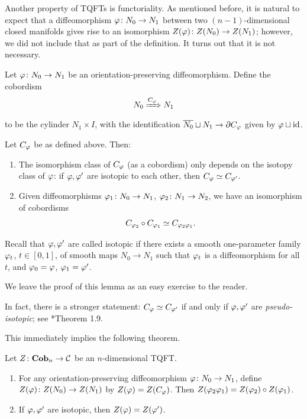 Another property of TQFTs is functoriality. As mentioned before, it is
natural to expect that a diffeomorphism $\varphi \colon N_0\to N_1$ between two
$(n-1)$-dimensional closed manifolds gives rise to an isomorphism
$Z(\varphi)\colon Z(N_0)\to Z(N_1)$; however, we did not include that as part of
the definition. It turns out that it is not necessary.

Let $\varphi \colon N_0\to N_1$ be an orientation-preserving diffeomorphism.
Define the cobordism
\begin{equation}\label{e:Cph}
  N_0\xRightarrow{C_\varphi} N_1
\end{equation}
to be the cylinder $N_1\times I$, with the identification $\overline{N_0}\sqcup N_1
\to \partial C_\varphi$ given by $\varphi\sqcup \operatorname{id}$.

\begin{lemma}\label{l:tqft-isotopy}
  Let $C_\varphi$ be as defined above. Then:
  \begin{enumerate}
    \item The isomorphism class of $C_\varphi$ \textup{(}as a cobordism\textup{)}
    only depends on the
    isotopy class of $\varphi$: if $\varphi, \varphi'$ are isotopic to each other, then
      $C_\varphi\simeq C_{\varphi'}$.
    \item Given diffeomorphisms $\varphi_1\colon N_0\to N_1$, $\varphi_2\colon N_1\to
      N_2$, we have an isomorphism of cobordisms
      $$
        C_{\varphi_2}\circ C_{\varphi_1}\simeq C_{\varphi_2 \varphi_1}.
      $$
  \end{enumerate}
\end{lemma}
Recall that $\varphi, \varphi'$ are called isotopic if there exists a smooth
one-parameter family $\varphi_t$, $t\in[0,1]$, of smooth maps $N_0\to N_1$ such that
$\varphi_t$ is a diffeomorphism for all $t$, and $\varphi_0=\varphi$, $\varphi_1=\varphi'$.

We leave the proof of this lemma as an easy exercise to the reader.

\begin{remark}\label{r:pseudo-isotopy}
  In fact, there is a stronger statement: $C_\varphi\simeq C_{\varphi'}$ if and only if
  $\varphi, \varphi'$ are \emph{pseudo-isotopic}; see
  *{Theorem 1.9}.
\end{remark}




This immediately implies  the following theorem.
\begin{theorem}\label{t:tqft-functoriality}
  Let $Z\colon \mathbf{Cob}_n\to \mathcal{C}$ be an $n$-dimensional TQFT.
  \begin{enumerate}
    \item For any orientation-preserving diffeomorphism $\varphi\colon N_0\to N_1$,
      define $Z(\varphi)\colon Z(N_0)\to Z(N_1)$ by $Z(\varphi)=Z(C_\varphi)$. Then
      $Z(\varphi_2\varphi_1)= Z(\varphi_2)\circ Z(\varphi_1)$.
    \item If $\varphi,\varphi'$ are isotopic, then $Z(\varphi)=Z(\varphi')$.
  \end{enumerate}
\end{theorem}

